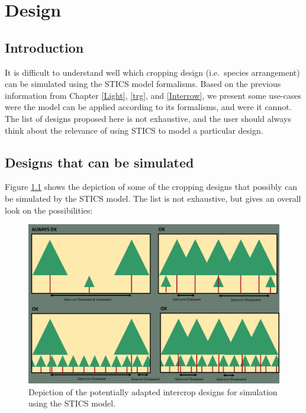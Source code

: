 \documentclass[]{book}
\theoremstyle{definition}
\theoremstyle{definition}
\theoremstyle{definition}
\theoremstyle{remark}
\begin{document}
\chapter{Design}\label{design}

\section{Introduction}\label{introduction-4}

It is difficult to understand well which cropping design (i.e.~species
arrangement) can be simulated using the STICS model formalisms. Based on
the previous information from Chapter \ref{Light}, \ref{trg}, and
\ref{Interrow}, we present some use-cases were the model can be applied
according to its formalisms, and were it cannot. The list of designs
proposed here is not exhaustive, and the user should always think about
the relevance of using STICS to model a particular design.

\section{Designs that can be
simulated}\label{designs-that-can-be-simulated}

Figure \ref{fig:DesignOK} shows the depiction of some of the cropping
designs that possibly can be simulated by the STICS model. The list is
not exhaustive, but gives an overall look on the possibilities:

\begin{figure}
\centering
\includegraphics{img/Design_OK.png}
\caption{\label{fig:DesignOK}Depiction of the potentially adapted intercrop
designs for simulation using the STICS model.}
\end{figure}
\end{document}
